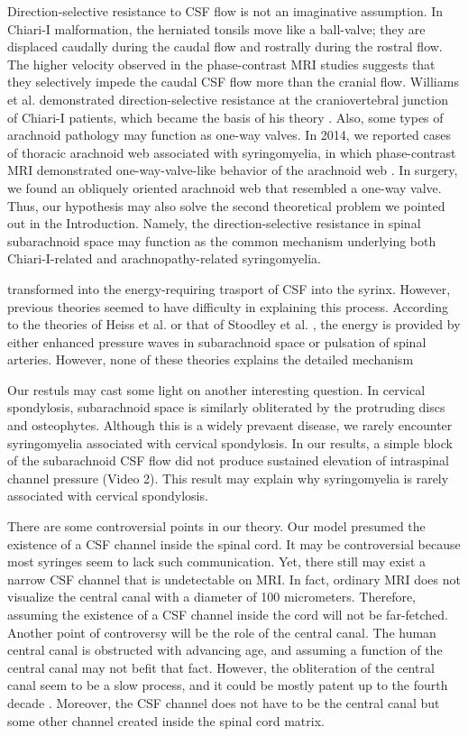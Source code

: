 \documentclass[fleqn,10pt]{wlscirep}
\begin{document}
Direction-selective resistance to CSF flow is not an imaginative
assumption. In Chiari-I malformation, the herniated tonsils move like a
ball-valve; they are displaced caudally during the caudal flow and
rostrally during the rostral flow. The higher velocity observed in the
phase-contrast MRI studies suggests that they selectively impede the caudal
CSF flow more than the cranial flow. Williams et al. demonstrated
direction-selective resistance at the craniovertebral junction of Chiari-I
patients, which became the basis of his theory
\cite{williams1981simultaneous}.  Also, some types of arachnoid pathology
may function as one-way valves. In 2014, we reported cases of thoracic
arachnoid web associated with syringomyelia, in which phase-contrast MRI
demonstrated one-way-valve-like behavior of the arachnoid web
\cite{chang2014dorsal}. In surgery, we found an obliquely oriented
arachnoid web that resembled a one-way valve. Thus, our hypothesis may also
solve the second theoretical problem we pointed out in the Introduction.
Namely, the direction-selective resistance in spinal subarachnoid space may
function as the common mechanism underlying both Chiari-I-related and
arachnopathy-related syringomyelia.


transformed into the energy-requiring trasport of CSF
into the syrinx.  However, previous theories seemed to have difficulty in
explaining this process.  According to the theories of Heiss et al.
\cite{heiss1999elucidating} or that of Stoodley et al.
\cite{stoodley2000mechanisms}, the energy is provided by either enhanced
pressure waves in subarachnoid space or pulsation of spinal arteries.
However, none of these theories explains the detailed mechanism

Our restuls may cast some light on another interesting question. In
cervical spondylosis, subarachnoid space is similarly obliterated by the
protruding discs and osteophytes. Although this is a widely prevaent
disease, we rarely encounter syringomyelia associated with cervical
spondylosis. In our results, a simple block of the subarachnoid CSF flow
did not produce sustained elevation of intraspinal channel pressure (Video
2).  This result may explain why syringomyelia is
rarely associated with cervical spondylosis.

There are some controversial points in our theory. Our model presumed the
existence of a CSF channel inside the spinal cord. It may be controversial
because most syringes seem to lack such communication. Yet, there still may
exist a narrow CSF channel that is undetectable on MRI. In fact, ordinary
MRI does not visualize the central canal with a diameter of 100
micrometers. Therefore, assuming the existence of a CSF channel inside the
cord will not be far-fetched. Another point of controversy will be the role
of the central canal. The human central canal is obstructed with advancing
age, and assuming a function of the central canal may not befit that fact.
However, the obliteration of the central canal seem to be a slow process,
and it could be mostly patent up to the fourth decade
\cite{newman1981observations, yasui1999agerelated}. Moreover, the CSF
channel does not have to be the central canal but some other channel
created inside the spinal cord matrix.


\end{document}
